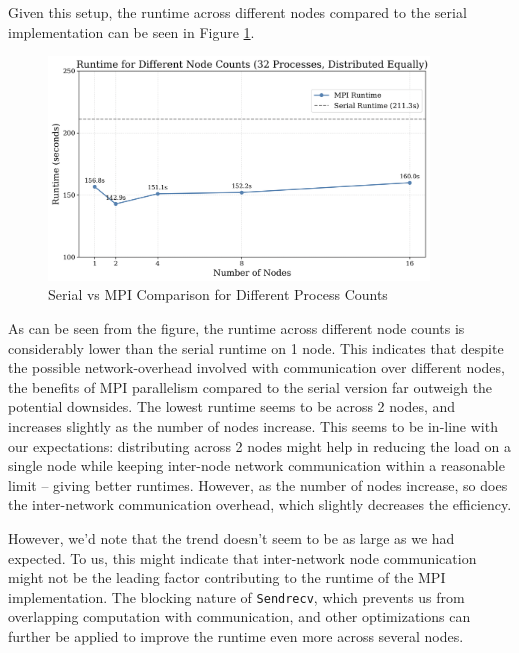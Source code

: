 \documentclass[a4paper,10pt]{article}
\begin{document}
Given this setup, the runtime across different nodes compared to the serial implementation can be seen in Figure \ref{fig:ex1_node_counts}.
\begin{figure}[H]
  \centering
  \includegraphics[width=0.9\textwidth]{img/ex1/diff_node_counts}
  \caption{Serial vs MPI Comparison for Different Process Counts}
  \label{fig:ex1_node_counts}
\end{figure}

As can be seen from the figure, the runtime across different node counts is considerably lower than the serial runtime on 1 node. This indicates that despite the possible network-overhead involved with communication over different nodes, the benefits of MPI parallelism compared to the serial version far outweigh the potential downsides. The lowest runtime seems to be across 2 nodes, and increases slightly as the number of nodes increase. This seems to be in-line with our expectations: distributing across 2 nodes might help in reducing the load on a single node while keeping inter-node network communication within a reasonable limit -- giving better runtimes. However, as the number of nodes increase, so does the inter-network communication overhead, which slightly decreases the efficiency. 

However, we'd note that the trend doesn't seem to be as large as we had expected. To us, this might indicate that inter-network node communication might not be the leading factor contributing to the runtime of the MPI implementation. The blocking nature of \verb|Sendrecv|, which prevents us from overlapping computation with communication, and other optimizations can further be applied to improve the runtime even more across several nodes. 
\end{document}
